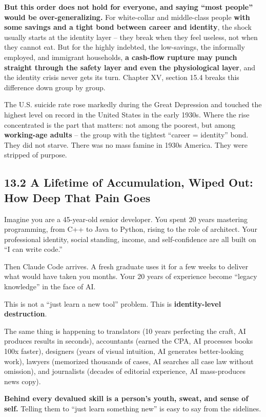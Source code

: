 \documentclass[11pt,a4paper]{article}
\begin{document}
\textbf{But this order does not hold for everyone, and saying ``most people'' would be over-generalizing.} For white-collar and middle-class people \textbf{with some savings and a tight bond between career and identity}, the shock usually starts at the identity layer -- they break when they feel useless, not when they cannot eat. But for the highly indebted, the low-savings, the informally employed, and immigrant households, \textbf{a cash-flow rupture may punch straight through the safety layer and even the physiological layer}, and the identity crisis never gets its turn. Chapter XV, section 15.4 breaks this difference down group by group.

The U.S. suicide rate rose markedly during the Great Depression and touched the highest level on record in the United States in the early 1930s. Where the rise concentrated is the part that matters: not among the poorest, but among \textbf{working-age adults} -- the group with the tightest ``career = identity'' bond. They did not starve. There was no mass famine in 1930s America. They were stripped of purpose.

\subsection{13.2 A Lifetime of Accumulation, Wiped Out: How Deep That Pain Goes}

Imagine you are a 45-year-old senior developer. You spent 20 years mastering programming, from C++ to Java to Python, rising to the role of architect. Your professional identity, social standing, income, and self-confidence are all built on ``I can write code.''

Then Claude Code arrives. A fresh graduate uses it for a few weeks to deliver what would have taken you months. Your 20 years of experience become ``legacy knowledge'' in the face of AI.

This is not a ``just learn a new tool'' problem. This is \textbf{identity-level destruction}.

The same thing is happening to translators (10 years perfecting the craft, AI produces results in seconds), accountants (earned the CPA, AI processes books 100x faster), designers (years of visual intuition, AI generates better-looking work), lawyers (memorized thousands of cases, AI searches all case law without omission), and journalists (decades of editorial experience, AI mass-produces news copy).

\textbf{Behind every devalued skill is a person's youth, sweat, and sense of self.} Telling them to ``just learn something new'' is easy to say from the sidelines.
\end{document}
